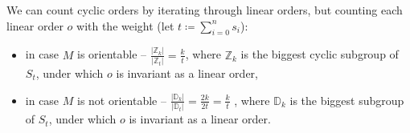 

We can count cyclic orders by iterating through linear orders, but counting each linear 
order $o$ with the 
weight (let $t \coloneqq \sum_{i = 0}^n s_i$):  
\begin{itemize}
\item in case $M$ is orientable -- $\frac{|\mathbb{Z}_k|}{|\mathbb{Z}_t|} = \frac{k}{t}$, 
where $\mathbb{Z}_k$ 
is the biggest cyclic subgroup of $S_t$, under which $o$ is invariant as a linear order,
\item in case $M$ is not orientable -- $\frac{|\mathbb{D}_k|}{|\mathbb{D}_t|} = \frac{2k}{2t} 
=\frac{k}{t}$ , 
where $\mathbb{D}_k$ is 
the biggest 
subgroup of $S_t$, under 
which $o$ is invariant as a linear order. 
\end{itemize}





